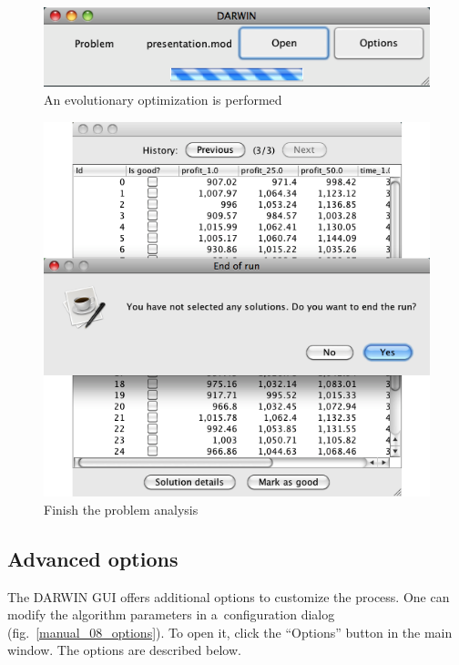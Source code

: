 \begin{figure}
  \centering
  \includegraphics[scale=0.7]{img/manual/06_evolutionary_loop}
  \caption{An evolutionary optimization is performed}
  \label{manual_06_evo_loop}
\end{figure}

\begin{figure}
  \centering
  \includegraphics[scale=0.7]{img/manual/07_end_of_run}
  \caption{Finish the problem analysis}
  \label{manual_07_finish}
\end{figure}

\clearpage{}
\subsection*{Advanced options}

The DARWIN GUI offers additional options to customize the process. One can
modify the algorithm parameters in a~configuration dialog
(fig.~\ref{manual_08_options}). To open it, click the ``Options'' button in
the main window. The options are described below.

